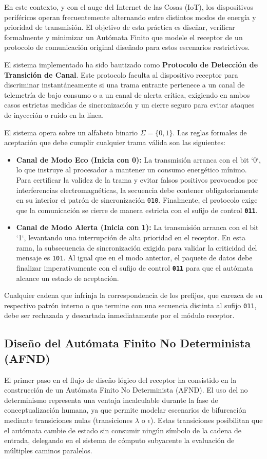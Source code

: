 \documentclass[12pt,a4paper]{article}
\begin{document}
En este contexto, y con el auge del Internet de las Cosas (IoT), los dispositivos periféricos operan frecuentemente alternando entre distintos modos de energía y prioridad de transmisión. El objetivo de esta práctica es diseñar, verificar formalmente y minimizar un Autómata Finito que modele el receptor de un protocolo de comunicación original diseñado para estos escenarios restrictivos. 

El sistema implementado ha sido bautizado como \textbf{Protocolo de Detección de Transición de Canal}. Este protocolo faculta al dispositivo receptor para discriminar instantáneamente si una trama entrante pertenece a un canal de telemetría de bajo consumo o a un canal de alerta crítica, exigiendo en ambos casos estrictas medidas de sincronización y un cierre seguro para evitar ataques de inyección o ruido en la línea.

El sistema opera sobre un alfabeto binario $\Sigma = \{0, 1\}$. Las reglas formales de aceptación que debe cumplir cualquier trama válida son las siguientes:
\begin{itemize}
    \item \textbf{Canal de Modo Eco (Inicia con 0):} La transmisión arranca con el bit `0`, lo que instruye al procesador a mantener un consumo energético mínimo. Para certificar la validez de la trama y evitar falsos positivos provocados por interferencias electromagnéticas, la secuencia debe contener obligatoriamente en su interior el patrón de sincronización \texttt{010}. Finalmente, el protocolo exige que la comunicación se cierre de manera estricta con el sufijo de control \textbf{\texttt{011}}.
    \item \textbf{Canal de Modo Alerta (Inicia con 1):} La transmisión arranca con el bit `1`, levantando una interrupción de alta prioridad en el receptor. En esta rama, la subsecuencia de sincronización exigida para validar la criticidad del mensaje es \texttt{101}. Al igual que en el modo anterior, el paquete de datos debe finalizar imperativamente con el sufijo de control \textbf{\texttt{011}} para que el autómata alcance un estado de aceptación.
\end{itemize}
Cualquier cadena que infrinja la correspondencia de los prefijos, que carezca de su respectivo patrón interno o que termine con una secuencia distinta al sufijo \texttt{011}, debe ser rechazada y descartada inmediatamente por el módulo receptor.

\newpage

\subsection{Diseño del Autómata Finito No Determinista (AFND)}
El primer paso en el flujo de diseño lógico del receptor ha consistido en la construcción de un Autómata Finito No Determinista (AFND). El uso del no determinismo representa una ventaja incalculable durante la fase de conceptualización humana, ya que permite modelar escenarios de bifurcación mediante transiciones nulas (transiciones $\lambda$ o $\epsilon$). Estas transiciones posibilitan que el autómata cambie de estado sin consumir ningún símbolo de la cadena de entrada, delegando en el sistema de cómputo subyacente la evaluación de múltiples caminos paralelos.
\end{document}
